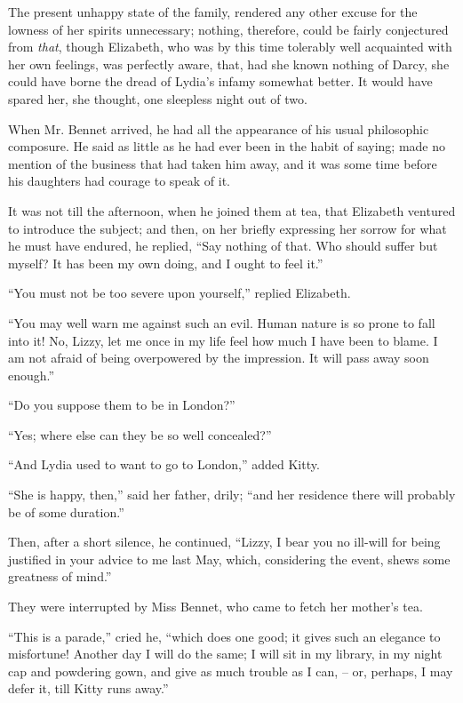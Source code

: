 The present unhappy state of the family, rendered any
other excuse for the lowness of her spirits unnecessary;
nothing, therefore, could be fairly conjectured from \textit{that},
though Elizabeth, who was by this time tolerably well
acquainted with her own feelings, was perfectly aware,
that, had she known nothing of Darcy, she could have
borne the dread of Lydia’s infamy somewhat better. It
would have spared her, she thought, one sleepless night
out of two.

When Mr. Bennet arrived, he had all the appearance
of his usual philosophic composure. He said as little as
he had ever been in the habit of saying; made no mention
of the business that had taken him away, and it was
some time before his daughters had courage to speak of it.

It was not till the afternoon, when he joined them at
tea, that Elizabeth ventured to introduce the subject;
and then, on her briefly expressing her sorrow for what
he must have endured, he replied, “Say nothing of that.
Who should suffer but myself? It has been my own
doing, and I ought to feel it.”

“You must not be too severe upon yourself,” replied
Elizabeth.

“You may well warn me against such an evil. Human
nature is so prone to fall into it! No, Lizzy, let me once
in my life feel how much I have been to blame. I am not
afraid of being overpowered by the impression. It will
pass away soon enough.”

“Do you suppose them to be in London?”

“Yes; where else can they be so well concealed?”

“And Lydia used to want to go to London,” added
Kitty.

“She is happy, then,” said her father, drily; “and
her residence there will probably be of some duration.”

Then, after a short silence, he continued, “Lizzy, I bear
you no ill-will for being justified in your advice to me
last May, which, considering the event, shews some
greatness of mind.”

They were interrupted by Miss Bennet, who came to
fetch her mother’s tea.

“This is a parade,” cried he, “which does one good;
it gives such an elegance to misfortune! Another day
I will do the same; I will sit in my library, in my night cap
and powdering gown, and give as much trouble as I can, -- or,
perhaps, I may defer it, till Kitty runs away.”

